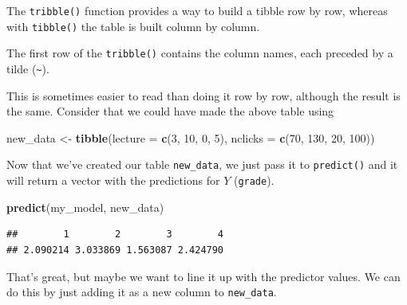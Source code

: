 \documentclass[]{book}
\newenvironment{Shaded}{\begin{snugshade}}{\end{snugshade}}
\newcommand{\DataTypeTok}[1]{\textcolor[rgb]{0.13,0.29,0.53}{#1}}
\newcommand{\DecValTok}[1]{\textcolor[rgb]{0.00,0.00,0.81}{#1}}
\newcommand{\KeywordTok}[1]{\textcolor[rgb]{0.13,0.29,0.53}{\textbf{#1}}}
\newcommand{\NormalTok}[1]{#1}
\newcommand{\OperatorTok}[1]{\textcolor[rgb]{0.81,0.36,0.00}{\textbf{#1}}}
\newcommand{\StringTok}[1]{\textcolor[rgb]{0.31,0.60,0.02}{#1}}
\begin{document}
The \texttt{tribble()} function provides a way to build a tibble row by row, whereas with \texttt{tibble()} the table is built column by column.

The first row of the \texttt{tribble()} contains the column names, each preceded by a tilde (\texttt{\textasciitilde{}}).

This is sometimes easier to read than doing it row by row, although the result is the same. Consider that we could have made the above table using

\begin{Shaded}
\begin{Highlighting}[]
\NormalTok{new_data <-}\StringTok{ }\KeywordTok{tibble}\NormalTok{(}\DataTypeTok{lecture =} \KeywordTok{c}\NormalTok{(}\DecValTok{3}\NormalTok{, }\DecValTok{10}\NormalTok{, }\DecValTok{0}\NormalTok{, }\DecValTok{5}\NormalTok{),}
                   \DataTypeTok{nclicks =} \KeywordTok{c}\NormalTok{(}\DecValTok{70}\NormalTok{, }\DecValTok{130}\NormalTok{, }\DecValTok{20}\NormalTok{, }\DecValTok{100}\NormalTok{))}
\end{Highlighting}
\end{Shaded}

Now that we've created our table \texttt{new\_data}, we just pass it to \texttt{predict()} and it will return a vector with the predictions for \(Y\) (\texttt{grade}).

\begin{Shaded}
\begin{Highlighting}[]
\KeywordTok{predict}\NormalTok{(my_model, new_data)}
\end{Highlighting}
\end{Shaded}

\begin{verbatim}
##        1        2        3        4 
## 2.090214 3.033869 1.563087 2.424790
\end{verbatim}

That's great, but maybe we want to line it up with the predictor values. We can do this by just adding it as a new column to \texttt{new\_data}.

\begin{Shaded}
\end{Shaded}
\end{document}
